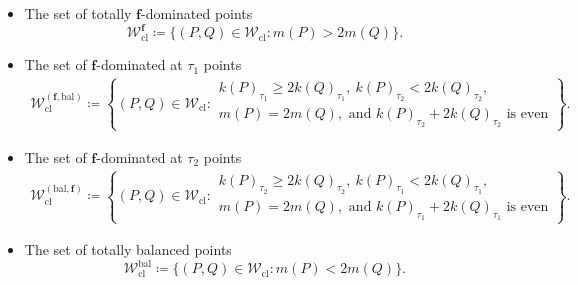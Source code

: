 \documentclass[10pt]{amsart}
\numberwithin{equation}{section}
\theoremstyle{definition}
\theoremstyle{remark} %
\newcommand{\mrm}{\mathrm}
\renewcommand{\b}{\mathrm{bal}}
\newcommand{\f}{\mathbf{f}}
\newcommand{\W}{\mathcal{W}}
\begin{document}
	\begin{itemize}
		\item The set of totally $ \f $-dominated points
		$$ \W_{\mrm{cl}}^\f \coloneqq \{ (P, Q) \in \W_{\mrm{cl}}\colon m(P) > 2m(Q) \}. $$
		\item The set of $ \f $-dominated at $ \tau_1 $ points
		\begin{align*}
			\W_{\mrm{cl}}^{(\f,\b)} \coloneqq \left\lbrace  (P, Q) \in \W_{\mrm{cl}}\colon \begin{aligned}
				k(P)_{\tau_1} \ge 2k(Q)_{\tau_1},\ k(P)_{\tau_2} < 2k(Q)_{\tau_2},\qquad \qquad \\
				m(P) =2m(Q),  
				\text{ and }k(P)_{\tau_2} + 2k(Q)_{\tau_2} \text{ is even} 
			\end{aligned}\right\rbrace .
		\end{align*}
		\item The set of $ \f $-dominated at $ \tau_2 $ points
		\begin{align*}
			\W_{\mrm{cl}}^{(\b,\f)} \coloneqq \left\lbrace  (P, Q) \in \W_{\mrm{cl}}\colon \begin{aligned}
				k(P)_{\tau_2} \ge 2k(Q)_{\tau_2},\ k(P)_{\tau_1} < 2k(Q)_{\tau_1},\qquad \qquad \\
				m(P) =2m(Q),  
				\text{ and }k(P)_{\tau_1} + 2k(Q)_{\tau_1} \text{ is even} 
			\end{aligned}\right\rbrace .
		\end{align*}
		\item The set of totally balanced points
		$$ \W_{\mrm{cl}}^{\mathrm{bal}} \coloneqq \{(P, Q) \in \W_{\mrm{cl}}\colon  m(P) < 2m(Q) \}. $$
	\end{itemize}
\end{document}
